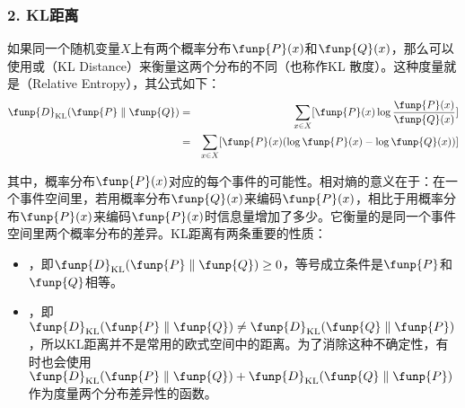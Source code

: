 
\subsubsection{2. KL距离}

\parinterval 如果同一个随机变量$X$上有两个概率分布$\funp{P}(x)$和$\funp{Q}(x)$，那么可以使用{\small{}}或{\small{}}（KL Distance）来衡量这两个分布的不同（也称作KL 散度）。这种度量就是{\small{}}（Relative Entropy），其公式如下：
\begin{eqnarray}
\funp{D}_{\textrm{KL}}(\funp{P}\parallel \funp{Q}) & = & \sum_{x \in X} [ \funp{P}(x)\log \frac{\funp{P}(x) }{ \funp{Q}(x) } ]  \nonumber \\
                                                                                       & = & \sum_{x \in X }[ \funp{P}(x)(\log \funp{P}(x)-\log \funp{Q}(x))]
\label{eq:2-15}
\end{eqnarray}

\parinterval 其中，概率分布$\funp{P}(x)$对应的每个事件的可能性。相对熵的意义在于：在一个事件空间里，若用概率分布$\funp{Q}(x)$来编码$\funp{P}(x)$，相比于用概率分布$\funp{P}(x)$来编码$\funp{P}(x)$时信息量增加了多少。它衡量的是同一个事件空间里两个概率分布的差异。KL距离有两条重要的性质：

\begin{itemize}
\vspace{0.5em}
\item {\small{}}，即$\funp{D}_{\textrm{KL}} (\funp{P} \parallel \funp{Q}) \ge 0$，等号成立条件是$\funp{P}$和$\funp{Q}$相等。
\vspace{0.5em}
\item {\small{}}，即$\funp{D}_{\textrm{KL}} (\funp{P} \parallel \funp{Q}) \neq \funp{D}_{\textrm{KL}} (\funp{Q}  \parallel \funp{P})$，所以$\textrm{KL}$距离并不是常用的欧式空间中的距离。为了消除这种不确定性，有时也会使用$\funp{D}_{\textrm{KL}} (\funp{P}  \parallel \funp{Q})+\funp{D}_{\textrm{KL}} (\funp{Q}  \parallel \funp{P})$作为度量两个分布差异性的函数。
\vspace{0.5em}
\end{itemize}


